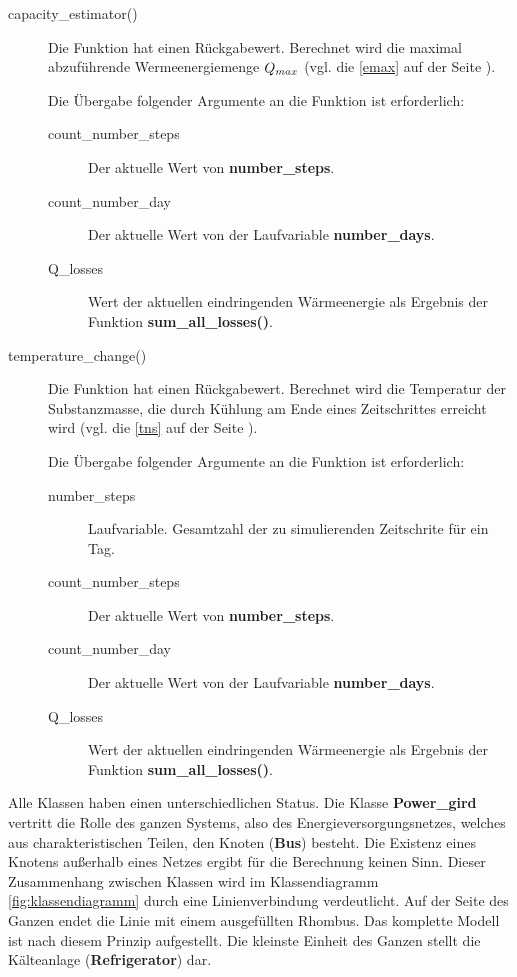 \begin{description}
	\item[capacity\_estimator()] Die Funktion hat einen R\"uckgabewert.
	Berechnet wird die maximal abzuf\"uhrende Wermeenergiemenge $Q_{max}$
	(vgl. die \cref{emax} auf der Seite \pageref{emax}).

	Die \"Ubergabe folgender Argumente an die Funktion ist erforderlich:
	\begin{description}
		\item[count\_number\_steps] Der aktuelle Wert von
		\textbf{number\_steps}.
		\item[count\_number\_day] Der aktuelle Wert von der Laufvariable
		\textbf{number\_days}.
		\item[Q\_losses] Wert der aktuellen eindringenden
		W\"armeenergie als Ergebnis der Funktion
		\textbf{sum\_all\_losses()}.
	\end{description}
	\item[temperature\_change()] Die Funktion hat einen R\"uckgabewert.
	Berechnet wird die Temperatur der Substanzmasse, die durch K\"uhlung am
	Ende eines Zeitschrittes erreicht wird (vgl. die \cref{tns} auf der
	Seite \pageref{tns}).
	
	Die \"Ubergabe folgender Argumente an die Funktion ist erforderlich:
	\begin{description}
		\item[number\_steps] Laufvariable. Gesamtzahl der zu
		simulierenden Zeitschrite f\"ur ein Tag.
		\item[count\_number\_steps] Der aktuelle Wert von
		\textbf{number\_steps}.
		\item[count\_number\_day] Der aktuelle Wert von der Laufvariable
		\textbf{number\_days}.
		\item[Q\_losses] Wert der aktuellen eindringenden
		W\"armeenergie als Ergebnis der Funktion
		\textbf{sum\_all\_losses()}.
	\end{description}
\end{description}

Alle Klassen haben einen unterschiedlichen Status. Die Klasse
\textbf{Power\_gird} vertritt die Rolle des ganzen Systems, also des
Energieversorgungsnetzes, welches aus charakteristischen Teilen, den Knoten
(\textbf{Bus}) besteht. Die Existenz eines Knotens au\ss erhalb eines Netzes
ergibt f\"ur die Berechnung keinen Sinn. Dieser Zusammenhang zwischen Klassen
wird im Klassendiagramm \cref{fig:klassendiagramm} durch eine Linienverbindung
verdeutlicht. Auf der Seite des Ganzen endet die Linie mit einem ausgef\"ullten
Rhombus. Das komplette Modell ist nach diesem Prinzip aufgestellt. Die kleinste
Einheit des Ganzen stellt die K\"alteanlage (\textbf{Refrigerator}) dar.


